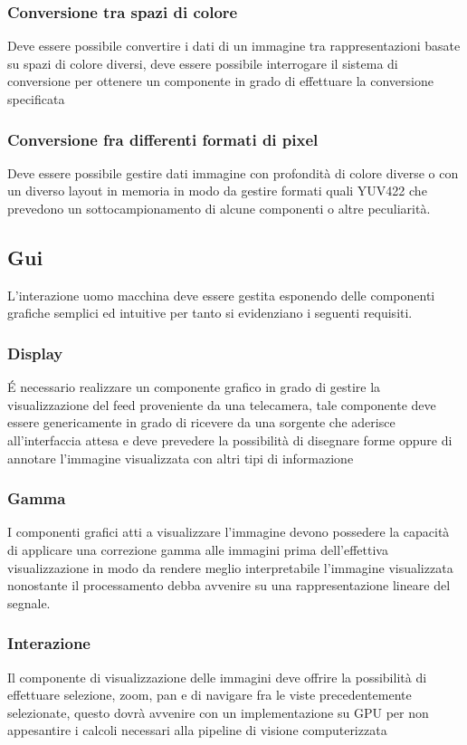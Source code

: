 \subsubsection{Conversione tra spazi di colore}
Deve essere possibile convertire i dati di un immagine tra rappresentazioni basate su spazi di colore diversi, deve essere possibile interrogare il sistema di conversione per ottenere un componente in grado di effettuare la conversione specificata

\subsubsection{Conversione fra differenti formati di pixel}
Deve essere possibile gestire dati immagine con profondità di colore diverse o con un diverso layout in memoria in modo da gestire formati quali YUV422 che prevedono un sottocampionamento di alcune componenti o altre peculiarità.

\subsection{Gui}
L'interazione uomo macchina deve essere gestita esponendo delle componenti grafiche semplici ed intuitive per tanto si evidenziano i seguenti requisiti.

\subsubsection{Display}
\'{E} necessario realizzare un componente grafico in grado di gestire la visualizzazione del feed proveniente da una telecamera, tale componente deve essere genericamente in grado di ricevere da una sorgente che aderisce all'interfaccia attesa e deve prevedere la possibilità di disegnare forme oppure di annotare l'immagine visualizzata con altri tipi di informazione

\subsubsection{Gamma}
I componenti grafici atti a visualizzare l'immagine devono possedere la capacità di applicare una correzione gamma alle immagini prima dell'effettiva visualizzazione in modo da rendere meglio interpretabile l'immagine visualizzata nonostante il processamento debba avvenire su una rappresentazione lineare del segnale.

\subsubsection{Interazione}
Il componente di visualizzazione delle immagini deve offrire la possibilità di effettuare  selezione, zoom, pan e di navigare fra le viste precedentemente selezionate, questo dovrà avvenire con un implementazione su GPU per non appesantire i calcoli necessari alla pipeline di visione computerizzata

